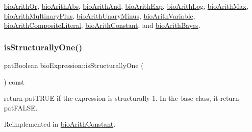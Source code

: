 \hyperlink{classbio_arith_or_a59ec27e29f35c91f0a5fd2a8993a363b}{bio\+Arith\+Or}, \hyperlink{classbio_arith_abs_a4caa32d24495b1204a0ae99d0be72934}{bio\+Arith\+Abs}, \hyperlink{classbio_arith_and_a3e89f3ee81dd4703fd77e5b2da1e45ad}{bio\+Arith\+And}, \hyperlink{classbio_arith_exp_a291d459eb5a41df1ac6409420a8a5713}{bio\+Arith\+Exp}, \hyperlink{classbio_arith_log_a31c9d372354ff2f971caffc594c555a9}{bio\+Arith\+Log}, \hyperlink{classbio_arith_max_a7d8d72eba4b603fadd764cac3cecf23a}{bio\+Arith\+Max}, \hyperlink{classbio_arith_multinary_plus_a90c1c66054e19f52a4424664f7c09d7a}{bio\+Arith\+Multinary\+Plus}, \hyperlink{classbio_arith_unary_minus_a0a31abb1d5a352b933c2d07cb2c657c8}{bio\+Arith\+Unary\+Minus}, \hyperlink{classbio_arith_variable_a49717d281e84536b65a715918fdfc4c5}{bio\+Arith\+Variable}, \hyperlink{classbio_arith_composite_literal_ab0471105a849e772c1e93f5b45b66acb}{bio\+Arith\+Composite\+Literal}, \hyperlink{classbio_arith_constant_a60b9f8bf637586c0464356dfcf3bc4a3}{bio\+Arith\+Constant}, and \hyperlink{classbio_arith_bayes_a7292ae29cd04168543674b1ae71f4bed}{bio\+Arith\+Bayes}.

\mbox{\label{classbio_expression_a754b37dd7a3e0bb943c23ed8ebd48eaa}} 
\subsubsection{\texorpdfstring{is\+Structurally\+One()}{isStructurallyOne()}}
{\footnotesize\ttfamily pat\+Boolean bio\+Expression\+::is\+Structurally\+One (\begin{DoxyParamCaption}{ }\end{DoxyParamCaption}) const\hspace{0.3cm}{\ttfamily [virtual]}}

return pat\+T\+R\+UE if the expression is structurally 1. In the base class, it return pat\+F\+A\+L\+SE. 

Reimplemented in \hyperlink{classbio_arith_constant_a979ab2441d612a23a708fa3c10f3dd6a}{bio\+Arith\+Constant}.

\mbox{\label{classbio_expression_a264c6d78671610ada8261d698e4c4c42}} 
